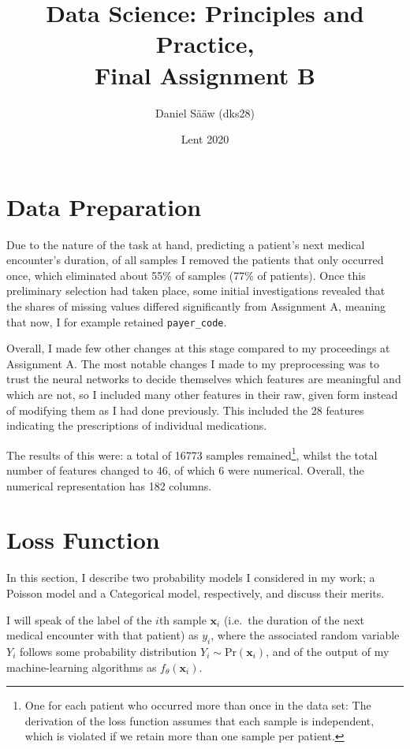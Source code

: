 \documentclass[10pt, twoside, a4paper]{article}
\author{Daniel Sääw (dks28)}
\title{Data Science: Principles and Practice,\\ Final Assignment B}
\date{Lent 2020}
\begin{document}
	\let\originalnewpage\newpage
	\let\newpage\relax
	\maketitle
	\let\newpage\originalnewpage

	\section{Data Preparation}

	Due to the nature of the task at hand, predicting a patient's next medical encounter's 
	duration, of all samples I removed the patients that only occurred once, which 
	eliminated about 55\% of samples (77\% of patients). 
	Once this preliminary selection had taken place, some initial investigations 
	revealed that the shares of missing values differed significantly from Assignment A, 
	meaning that now, I for example retained \texttt{payer\_code}.  
	
	Overall, I made few other changes at this stage compared to my proceedings at Assignment A.
	The most notable changes I made to my preprocessing was to trust the neural networks to 
	decide themselves which features are meaningful and which are not, so I included many other 
	features in their raw, given form instead of modifying them as I had done previously. This
	included the 28 features indicating the prescriptions of individual medications.

	The results of this were: a total of 16773 samples remained\footnote{
	One for each patient who occurred more than once in the data set: The derivation of the 
	loss function assumes that each sample is independent, which is violated if we retain more 
	than one sample per patient.}, whilst 
	the total number of features changed to 46, of which 6 were numerical. Overall, the 
	numerical representation has 182 columns.

	\section{Loss Function}

	In this section, I describe two probability models I considered in my work; a Poisson model 
	and a Categorical model, respectively, and discuss their merits.
	
	I will speak of the label of the $i$th sample $\mathbf{x}_i$ (i.e.\ the 
	duration of the next medical encounter with that patient) as $y_i$, where the associated 
	random variable $Y_i$ follows some probability distribution $Y_i \sim 
	\mathrm{Pr}(\mathbf{x}_i)$, and of the output of my machine-learning algorithms as
	$f_\theta(\mathbf{x}_i)$.
\end{document}
